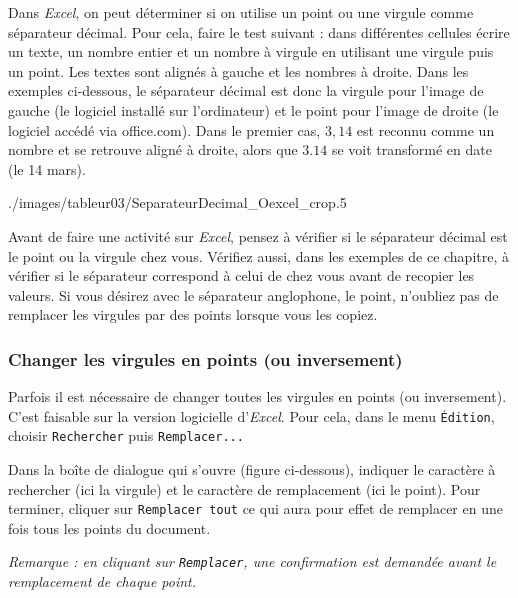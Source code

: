 \vspace{6pt}

Dans \emph{Excel}, on peut déterminer si on utilise un point ou une virgule comme séparateur décimal. Pour cela, faire le test suivant : dans différentes cellules écrire un texte, un nombre entier et un nombre à virgule en utilisant une virgule puis un point. Les textes sont alignés à gauche et les nombres à droite. Dans les exemples ci-dessous, le séparateur décimal est donc la virgule pour l'image de gauche (le logiciel installé sur l'ordinateur) et le point pour l'image de droite (le logiciel accédé via office.com). Dans le premier cas, $3,14$ est reconnu comme un nombre et se retrouve aligné à droite, alors que $3.14$ se voit transformé en date (le 14 mars).

%  
{./images/tableur03/SeparateurDecimal_Oexcel_crop}{.5\textwidth}

Avant de faire une activité sur \emph{Excel}, pensez à vérifier si le séparateur décimal est le point ou la virgule chez vous. Vérifiez aussi, dans les exemples de ce chapitre, à vérifier si le séparateur correspond à celui de chez vous avant de recopier les valeurs. Si vous désirez avec le séparateur anglophone, le point, n'oubliez pas de remplacer les virgules par des points lorsque vous les copiez.

\subsubsection{Changer les virgules en points (ou inversement)}

Parfois il est nécessaire de changer toutes les virgules en points (ou inversement). C'est faisable sur la version logicielle d'\emph{Excel}. Pour cela, dans le menu \texttt{Édition}, choisir \texttt{Rechercher} puis \texttt{Remplacer...}


Dans la boîte de dialogue qui s'ouvre (figure ci-dessous), indiquer le caractère à rechercher  (ici la virgule) et le caractère de remplacement  (ici le point). Pour terminer, cliquer sur \texttt{Remplacer tout}  ce qui aura pour effet de remplacer en une fois tous les points du document.

\emph{Remarque : en cliquant sur \texttt{Remplacer}, une confirmation est demandée avant le remplacement de chaque point.}

